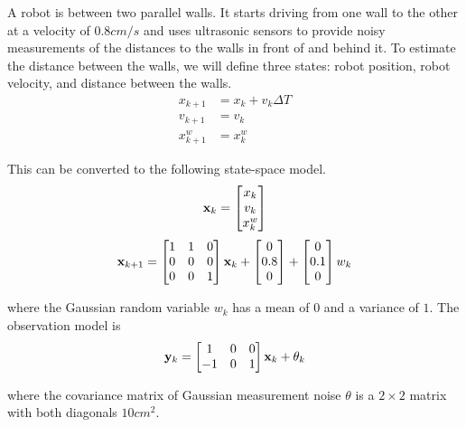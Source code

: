 A robot is between two parallel walls. It starts driving from one wall to the
other at a velocity of $0.8 cm/s$ and uses ultrasonic sensors to provide noisy
measurements of the distances to the walls in front of and behind it. To
estimate the distance between the walls, we will define three \glspl{state}:
robot position, robot velocity, and distance between the walls.
\begin{align}
  x_{k+1} &= x_k + v_k \Delta T \\
  v_{k+1} &= v_k \\
  x_{k+1}^w &= x_k^w
\end{align}

This can be converted to the following state-space \gls{model}.
\begin{equation}
  \mathbf{x}_k =
  \begin{bmatrix}
    x_k \\
    v_k \\
    x_k^w
  \end{bmatrix}
\end{equation}
\begin{equation}
  \mathbf{x}_{k+1} =
  \begin{bmatrix}
    1 & 1 & 0 \\
    0 & 0 & 0 \\
    0 & 0 & 1
  \end{bmatrix} \mathbf{x}_k +
  \begin{bmatrix}
    0 \\
    0.8 \\
    0
  \end{bmatrix} +
  \begin{bmatrix}
    0 \\
    0.1 \\
    0
  \end{bmatrix} w_k
\end{equation}

where the Gaussian random variable $w_k$ has a mean of $0$ and a variance of
$1$. The observation \gls{model} is
\begin{equation}
  \mathbf{y}_k =
  \begin{bmatrix}
    1 & 0 & 0 \\
    -1 & 0 & 1
  \end{bmatrix} \mathbf{x}_k + \theta_k
\end{equation}

where the covariance matrix of Gaussian measurement noise $\theta$ is a
$2 \times 2$ matrix with both diagonals $10 cm^2$.

